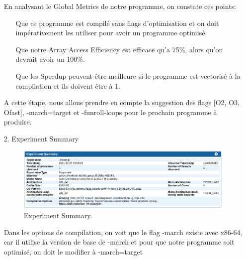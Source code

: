 \documentclass[a4paper, 12pt, twoside]{article}
\begin{document}
\begin{enumerate}
\begin{figure}[h]
    \end{figure}
    \newpage
    En analysant le Global Metrics de notre programme, on constate ces points:
    \begin{enumerate}
        \item[\textbullet]Que ce programme est compilé sans flags d'optimisation et on doit impérativement les utiliser pour avoir un programme optimisé.
        \item[\textbullet]Que notre Array Access Efficiency est efficace qu'a 75\%, alors qu'on devrait avoir un 100\%.
        \item[\textbullet]Que les Speedup peuvent-être meilleure si le programme est vectorisé à la compilation et ils doivent être à 1.
        \item[\textbullet]
    \end{enumerate}
    
A cette étape, nous allons prendre en compte la suggestion des flags [O2, O3, Ofast], -march=target et -funroll-loops pour le prochain programme à produire.
    
        \item[2.]Experiment Summary
         \begin{figure}[h]
    \centering
    \includegraphics[width=\textwidth]{Figures/cap2.png}
    \caption{Experiment Summary.}
    
    \end{figure}
    
    
    Dans les options de compilation, on voit que le flag -march existe avec x86-64, car il utilise la version de base de -march et pour que notre programme soit optimisé, on doit le modifier à -march=target
    \end{enumerate}
   
\end{document}
